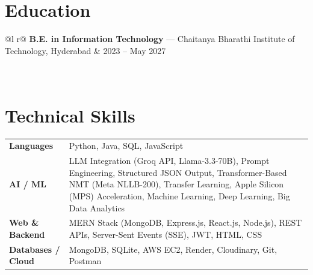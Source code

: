 \documentclass[a4paper,10.5pt]{article}
\begin{document}
\section{Education}
\vspace{1pt}
\begin{tabularx}{\linewidth}{@{}l r@{}}
\textbf{B.E. in Information Technology} --- Chaitanya Bharathi Institute of Technology, Hyderabad & \hfill 2023 -- May 2027 \\[2pt]
 \\[2pt]
 \\
\end{tabularx}

\section{Technical Skills}
\vspace{1pt}
\begin{tabularx}{\linewidth}{@{}l X@{}}
\textbf{Languages}         & Python, Java, SQL, JavaScript \\[2pt]
\textbf{AI / ML}           & LLM Integration (Groq API, Llama-3.3-70B), Prompt Engineering, Structured JSON Output, Transformer-Based NMT (Meta NLLB-200), Transfer Learning, Apple Silicon (MPS) Acceleration, Machine Learning, Deep Learning, Big Data Analytics \\[2pt]
\textbf{Web \& Backend}    & MERN Stack (MongoDB, Express.js, React.js, Node.js), REST APIs, Server-Sent Events (SSE), JWT, HTML, CSS \\[2pt]
\textbf{Databases / Cloud} & MongoDB, SQLite, AWS EC2, Render, Cloudinary, Git, Postman \\
\end{tabularx}

\end{document}
